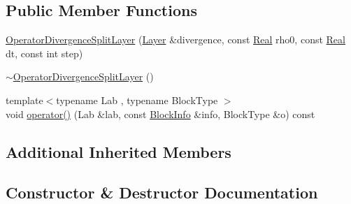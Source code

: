 \subsection*{Public Member Functions}
\begin{DoxyCompactItemize}
\item 
\hyperlink{class_operator_divergence_split_layer_adb870cc91b9c8ac69230cf5f35b625db}{Operator\+Divergence\+Split\+Layer} (\hyperlink{struct_layer}{Layer} \&divergence, const \hyperlink{_h_d_f5_dumper_8h_a445a5f0e2a34c9d97d69a3c2d1957907}{Real} rho0, const \hyperlink{_h_d_f5_dumper_8h_a445a5f0e2a34c9d97d69a3c2d1957907}{Real} dt, const int step)
\item 
\hyperlink{class_operator_divergence_split_layer_a72db398a6d2ecb9ac29b6db752802bda}{$\sim$\+Operator\+Divergence\+Split\+Layer} ()
\item 
{\footnotesize template$<$typename Lab , typename Block\+Type $>$ }\\void \hyperlink{class_operator_divergence_split_layer_a87a9676b91dbe960ebcb4a00463e4aa6}{operator()} (Lab \&lab, const \hyperlink{struct_block_info}{Block\+Info} \&info, Block\+Type \&o) const 
\end{DoxyCompactItemize}
\subsection*{Additional Inherited Members}


\subsection{Constructor \& Destructor Documentation}
\hypertarget{class_operator_divergence_split_layer_adb870cc91b9c8ac69230cf5f35b625db}{}

